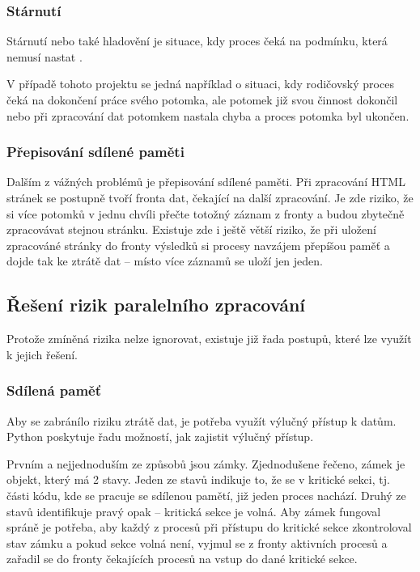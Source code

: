 \subsubsection{Stárnutí}
Stárnutí nebo také hladovění je situace, kdy proces čeká na podmínku, která nemusí nastat \cite{SYNCPROCES}.

V případě tohoto projektu se jedná například o situaci, kdy rodičovský proces čeká na dokončení práce svého
potomka, ale potomek již svou činnost dokončil nebo při zpracování dat potomkem nastala chyba a proces potomka
byl ukončen.

\subsubsection{Přepisování sdílené paměti}
Dalším z vážných problémů je přepisování sdílené paměti. Při zpracování HTML stránek se postupně tvoří
fronta dat, čekající na další zpracování. Je zde riziko, že si více potomků v jednu chvíli přečte totožný
záznam z fronty a budou zbytečně zpracovávat stejnou stránku. Existuje zde i ještě větší riziko,
že při uložení zpracováné stránky do fronty výsledků si procesy navzájem přepíšou paměť a dojde tak
ke ztrátě dat -- místo více záznamů se uloží jen jeden.

\subsection{Řešení rizik paralelního zpracování}
\label{paralel_hazards}
Protože zmíněná rizika nelze ignorovat, existuje již řada postupů, které lze využít k jejich řešení.

\subsubsection{Sdílená paměť}
Aby se zabránílo riziku ztrátě dat, je potřeba využít výlučný přístup k datům. Python
poskytuje řadu možností, jak zajistit výlučný přístup.

Prvním a nejjednoduším ze způsobů jsou zámky. Zjednodušene řečeno, zámek je objekt, který má 2 stavy.
Jeden ze stavů indikuje to, že se v kritické sekci, tj. části kódu, kde se pracuje se sdílenou pamětí,
již jeden proces nachází. Druhý ze stavů identifikuje pravý opak -- kritická sekce je volná. Aby zámek
fungoval spráně je potřeba, aby každý z procesů při přístupu do kritické sekce zkontroloval stav
zámku a pokud sekce volná není, vyjmul se z fronty aktivních procesů a zařadil se do fronty čekajících
procesů na vstup do dané kritické sekce.

